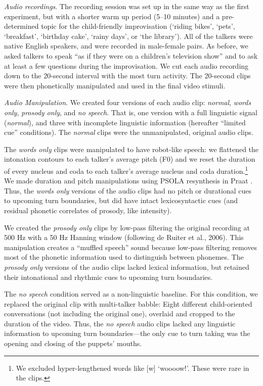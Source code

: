 \documentclass[authoryear, 12pt]{elsarticle}
\begin{document}
\textit{Audio recordings}. The recording session was set up in the same way as the first experiment, but with a shorter warm up period (5--10 minutes) and a pre-determined topic for the child-friendly improvisation (`riding bikes', `pets', `breakfast', `birthday cake', `rainy days', or `the library'). All of the talkers were native English speakers, and were recorded in male-female pairs. As before, we asked talkers to speak ``as if they were on a children's television show'' and to ask at least a few questions during the improvisation. We cut each audio recording down to the 20-second interval with the most turn activity. The 20-second clips were then phonetically manipulated and used in the final video stimuli.

\textit{Audio Manipulation}. We created four versions of each audio clip: \textit{normal}, \textit{words only}, \textit{prosody only}, and \textit{no speech}. That is, one version with a full linguistic signal (\textit{normal}), and three with incomplete linguistic information (hereafter ``limited cue'' conditions). The \textit{normal} clips were the unmanipulated, original audio clips. 

The \textit{words only} clips were manipulated to have robot-like speech: we flattened the intonation contours to each talker's average pitch (F0) and we reset the duration of every nucleus and coda to each talker's average nucleus and coda duration.\footnote{We excluded hyper-lengthened words like [w] `woooow!'. These were rare in the clips.} We made duration and pitch manipulations using PSOLA resynthesis in Praat \citep{Praat}. Thus, the \textit{words only} versions of the audio clips had no pitch or durational cues to upcoming turn boundaries, but did have intact lexicosyntactic cues (and residual phonetic correlates of prosody, like intensity). 

We created the \textit{prosody only} clips by low-pass filtering the original recording at 500 Hz with a 50 Hz Hanning window (following de Ruiter et al., 2006). This manipulation creates a ``muffled speech'' sound because low-pass filtering removes most of the phonetic information used to distinguish between phonemes. The \textit{prosody only} versions of the audio clips lacked lexical information, but retained their intonational and rhythmic cues to upcoming turn boundaries. 

The \textit{no speech} condition served as a non-linguistic baseline. For this condition, we replaced the original clip with multi-talker babble: Eight different child-oriented conversations (not including the original one), overlaid and cropped to the duration of the video. Thus, the \textit{no speech} audio clips lacked any linguistic information to upcoming turn boundaries---the only cue to turn taking was the opening and closing of the puppets' mouths. 
\end{document}

